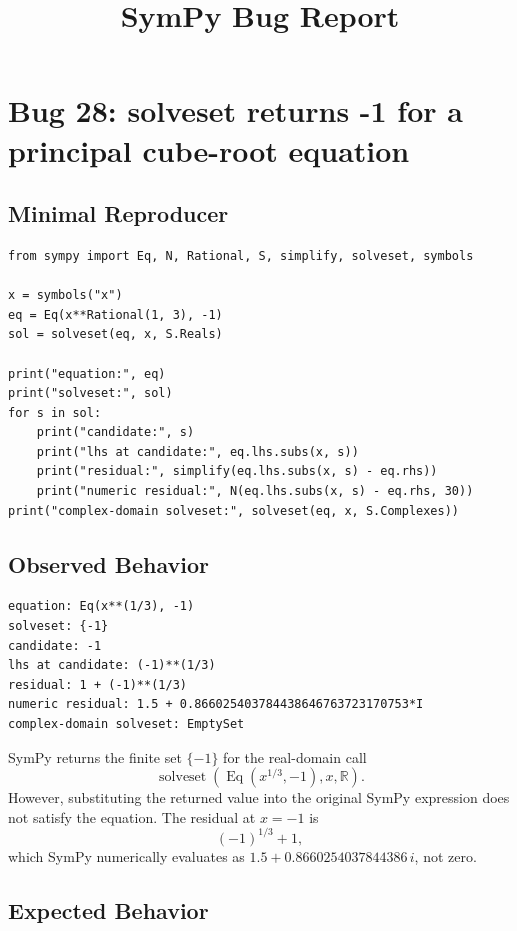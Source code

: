 \documentclass[11pt]{article}
\title{SymPy Bug Report}
\author{}
\date{}
\begin{document}
\maketitle

\section{Bug 28: solveset returns -1 for a principal cube-root equation}

\subsection{Minimal Reproducer}

\medskip

\begin{lstlisting}[style=bugpython]
from sympy import Eq, N, Rational, S, simplify, solveset, symbols

x = symbols("x")
eq = Eq(x**Rational(1, 3), -1)
sol = solveset(eq, x, S.Reals)

print("equation:", eq)
print("solveset:", sol)
for s in sol:
    print("candidate:", s)
    print("lhs at candidate:", eq.lhs.subs(x, s))
    print("residual:", simplify(eq.lhs.subs(x, s) - eq.rhs))
    print("numeric residual:", N(eq.lhs.subs(x, s) - eq.rhs, 30))
print("complex-domain solveset:", solveset(eq, x, S.Complexes))
\end{lstlisting}

\subsection{Observed Behavior}

\medskip

\begin{lstlisting}[style=bugpython]
equation: Eq(x**(1/3), -1)
solveset: {-1}
candidate: -1
lhs at candidate: (-1)**(1/3)
residual: 1 + (-1)**(1/3)
numeric residual: 1.5 + 0.866025403784438646763723170753*I
complex-domain solveset: EmptySet
\end{lstlisting}

SymPy returns the finite set \(\{-1\}\) for the real-domain call
\[
\operatorname{solveset}(\operatorname{Eq}(x^{1/3},-1),x,\mathbb{R}).
\]
However, substituting the returned value into the original SymPy expression
does not satisfy the equation.  The residual at \(x=-1\) is
\[
(-1)^{1/3}+1,
\]
which SymPy numerically evaluates as \(1.5+0.8660254037844386\,i\), not zero.

\subsection{Expected Behavior}
\end{document}

